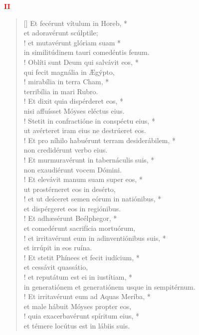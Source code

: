 \begin{center}
\textcolor{red}{\bf II}
\end{center}
\begin{verse}[\versewidth]
Et fecérunt vítulum in Horeb, *\\
et adoravérunt scúlptile;\\!
\vin et mutavérunt glóriam suam *\\
\vin in similitúdinem tauri comedéntis fenum.\\!
Oblíti sunt Deum qui salvávit eos, *\\
qui fecit magnália in Ægýpto,\\!
\vin mirabília in terra Cham, *\\
\vin terribília in mari Rubro.\\!
Et dixit quia dispérderet eos, *\\
nisi affuísset Móyses eléctus eius.\\!
\vin Stetit in confractióne in conspéctu eius, *\\
\vin ut avérteret iram eius ne destrúeret eos.\\!
Et pro níhilo habuérunt terram desiderábilem, *\\
non credidérunt verbo eius.\\!
\vin Et murmuravérunt in tabernáculis suis, *\\
\vin non exaudiérunt vocem Dómini.\\!
Et elevávit manum suam super eos, *\\
ut prostérneret eos in desérto,\\!
\vin et ut deíceret semen eórum in natiónibus, *\\
\vin et dispérgeret eos in regiónibus.\\!
Et adhæsérunt Beélphegor, *\\
et comedérunt sacrifícia mortuórum,\\!
\vin et irritavérunt eum in adinventiónibus suis, *\\
\vin et irrúpit in eos ruína.\\!
Et stetit Phínees et fecit iudícium, *\\
et cessávit quassátio,\\!
\vin et reputátum est ei in iustítiam, *\\
\vin in generatiónem et generatiónem usque in sempitérnum.\\!
Et irritavérunt eum ad Aquas Meríba, *\\
et male hábuit Móyses propter eos,\\!
\vin quia exacerbavérunt spíritum eius, *\\
\vin et témere locútus est in lábiis suis.\\
\end{verse}
